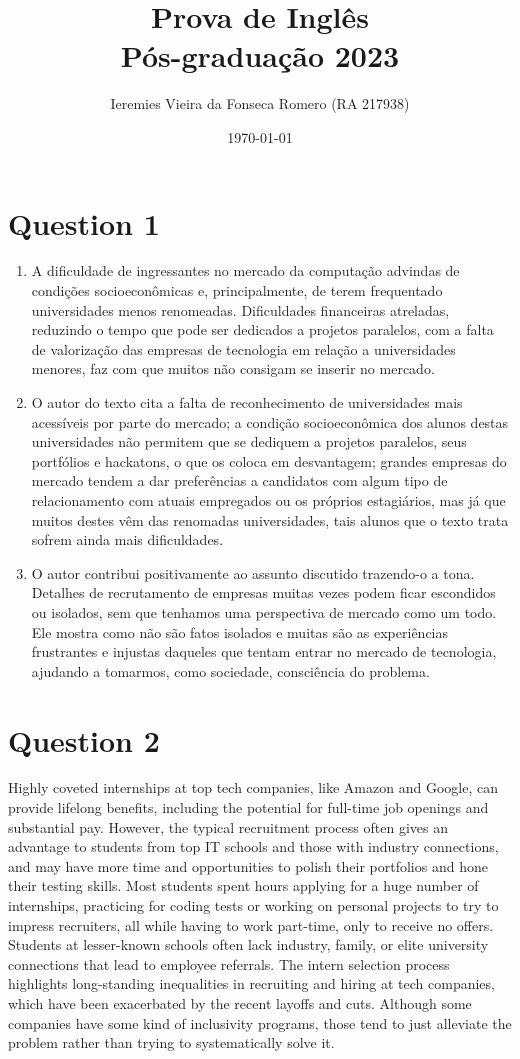 \documentclass[11pt]{article}
\author{Ieremies Vieira da Fonseca Romero (RA 217938)}
\date{\today}
\title{Prova de Inglês\\\medskip
\large Pós-graduação 2023}
\begin{document}
\maketitle

\section*{Question 1}
\label{sec:orge8472e4}
\begin{enumerate}
\item A dificuldade de ingressantes no mercado da computação advindas de condições socioeconômicas e, principalmente, de terem frequentado universidades menos renomeadas. Dificuldades financeiras atreladas, reduzindo o tempo que pode ser dedicados a projetos paralelos, com a falta de valorização das empresas de tecnologia em relação a universidades menores, faz com que muitos não consigam se inserir no mercado.
\item O autor do texto cita a falta de reconhecimento de universidades mais acessíveis por parte do mercado; a condição socioeconômica dos alunos destas universidades não permitem que se dediquem a projetos paralelos, seus portfólios e hackatons, o que os coloca em desvantagem; grandes empresas do mercado tendem a dar preferências a candidatos com algum tipo de relacionamento com atuais empregados ou os próprios estagiários, mas já que muitos destes vêm das renomadas universidades, tais alunos que o texto trata sofrem ainda mais dificuldades.
\item O autor contribui positivamente ao assunto discutido trazendo-o a tona. Detalhes de recrutamento de empresas muitas vezes podem ficar escondidos ou isolados, sem que tenhamos uma perspectiva de mercado como um todo. Ele mostra como não são fatos isolados e muitas são as experiências frustrantes e injustas daqueles que tentam entrar no mercado de tecnologia, ajudando a tomarmos, como sociedade, consciência do problema.
\end{enumerate}
\section*{Question 2}
\label{sec:orga5f9256}
Highly coveted internships at top tech companies, like Amazon and Google, can provide lifelong benefits, including the potential for full-time job openings and substantial pay. However, the typical recruitment process often gives an advantage to students from top IT schools and those with industry connections, and may have more time and opportunities to polish their portfolios and hone their testing skills. Most students spent hours applying for a huge number of internships, practicing for coding tests or working on personal projects to try to impress recruiters, all while having to work part-time, only to receive no offers. Students at lesser-known schools often lack industry, family, or elite university connections that lead to employee referrals. The intern selection process highlights long-standing inequalities in recruiting and hiring at tech companies, which have been exacerbated by the recent layoffs and cuts. Although some companies have some kind of inclusivity programs, those tend to just alleviate the problem rather than trying to systematically solve it.
\end{document}
